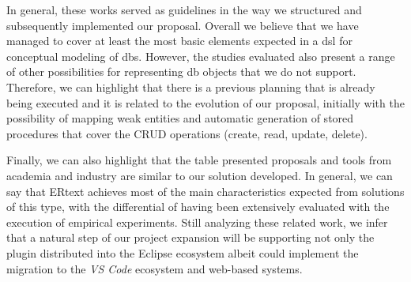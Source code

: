 In general, these works served as guidelines in the way we structured and subsequently implemented our proposal.
Overall we believe that we have managed to cover at least the most basic elements expected in a \ac{dsl} for conceptual modeling of \acp{db}.
However, the studies evaluated also present a range of other possibilities for representing \ac{db} objects that we do not support.
Therefore, we can highlight that there is a previous planning that is already being executed and it is related to the evolution of our proposal, initially with the possibility of mapping weak entities and automatic generation of stored procedures that cover the CRUD operations (create, read, update, delete).

Finally, we can also highlight that the table presented proposals and tools from academia and industry are similar to our solution developed.
In general, we can say that ERtext achieves most of the main characteristics expected from solutions of this type, with the differential of having been extensively evaluated with the execution of empirical experiments.
Still analyzing these related work, we infer that a natural step of our project expansion will be supporting not only the plugin distributed into the Eclipse ecosystem albeit could implement the migration to the \textit{VS Code} ecosystem and web-based systems.
